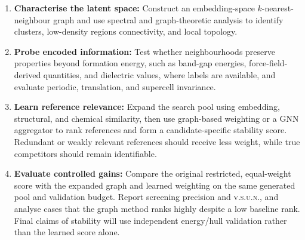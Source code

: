 \documentclass[10pt,a4paper]{article}
\newcommand{\vsun}{\textsc{v.s.u.n.}}
\begin{document}
\noindent
\begin{minipage}[t]{0.66\textwidth}
\vspace{0pt}
\begin{enumerate}[label=\textbf{\arabic*.}]
  \item \textbf{Characterise the latent space:} Construct an embedding-space $k$-nearest-neighbour graph and use spectral and graph-theoretic analysis to identify clusters, low-density regions connectivity, and local topology.

  \item \textbf{Probe encoded information:} Test whether neighbourhoods preserve properties beyond formation energy, such as band-gap energies, force-field-derived quantities, and dielectric values, where labels are available, and evaluate periodic, translation, and supercell invariance.
  
  \item \textbf{Learn reference relevance:} Expand the search pool using embedding, structural, and chemical similarity, then use graph-based weighting or a GNN aggregator to rank references and form a candidate-specific stability score. Redundant or weakly relevant references should receive less weight, while true competitors should remain identifiable.

  \item \textbf{Evaluate controlled gains:} Compare the original restricted, equal-weight score with the expanded graph and learned weighting on the same generated pool and validation budget. Report screening precision and \vsun, and analyse cases that the graph method ranks highly despite a low baseline rank. Final claims of stability will use independent energy/hull validation rather than the learned score alone.
\end{enumerate}
\end{minipage}
\hfill
\end{document}
